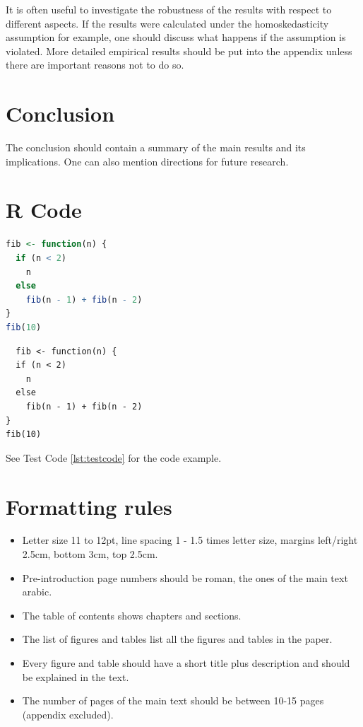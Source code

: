 \documentclass[12pt,a4paper]{article}
\begin{document}
It is often useful to investigate the robustness of the results
with respect to different aspects. If the results were calculated under
the homoskedasticity assumption for example, one should discuss what
happens if the assumption is violated. More detailed empirical results
should be put into the appendix unless there are important reasons not to do
so.

\section{Conclusion}

The conclusion should contain a summary of the main results and its implications. One can
also mention directions for future research.

\clearpage
\appendix
\section{R Code}
\begin{lstlisting}[language=R,caption={Fibonacci Secquence}, label=lst:testcode]
fib <- function(n) {
  if (n < 2)
    n
  else
    fib(n - 1) + fib(n - 2)
}
fib(10)
\end{lstlisting}

\begin{verbatim}
  fib <- function(n) {
  if (n < 2)
    n
  else
    fib(n - 1) + fib(n - 2)
}
fib(10)
\end{verbatim}

See Test Code \ref{lst:testcode} for the code example.

\section{Formatting rules}

\begin{center}
\begin{itemize}
\item Letter size 11 to 12pt, line spacing 1 - 1.5 times letter size, margins left/right 2.5cm, bottom 3cm, top 2.5cm.
\item Pre-introduction page numbers should be roman, the ones of the main text arabic.
\item The table of contents shows chapters and sections.
\item The list of figures and tables list all the figures and tables in the paper.
\item Every figure and table should have a short title plus description and should be explained in the text.
\item The number of pages of the main text should be between 10-15 pages (appendix excluded).
\end{itemize}
\end{center}
\end{document}
